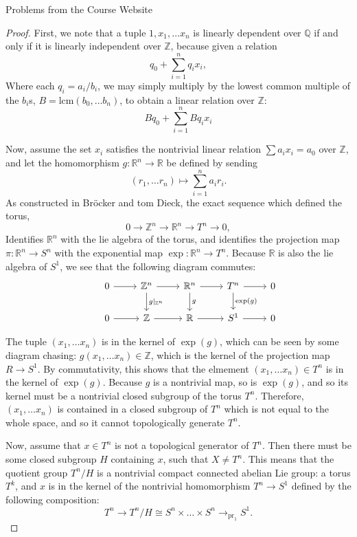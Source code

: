 \documentclass[12pt]{article}
\newcommand{\Q}{\mathbb{Q}}
\newcommand{\Z}{\mathbb{Z}}
\newcommand{\R}{\mathbb{R}}
\theoremstyle{definition}
\newenvironment{problem}[2][Problem]{\begin{trivlist}
\item[\hskip \labelsep {\bfseries #1}\hskip \labelsep {\bfseries #2.}]}{\end{trivlist}}
\begin{document}
\begin{section}{Problems from the Course Website}
\begin{problem}{4}
		\begin{proof}
			First, we note that a tuple $1, x_1, \dots x_n$ is linearly dependent over $\Q$ if and only if it is linearly independent over $\Z$, because given a relation
			\[q_0 + \sum_{i=1}^n q_i x_i,\]
			Where each $q_i = a_i / b_i$, we may simply multiply by the lowest common multiple of the $b_i$s, $B = \text{lcm}(b_0, \dots b_n)$,  to obtain a linear relation over $\Z$:
			\[Bq_0 + \sum_{i=1}^n Bq_ix_i\]
			\par Now, assume the set $x_i$ satisfies the nontrivial linear relation $\sum a_i x_i = a_0$ over $\Z$, and let the homomorphism $g: \R^n \to \R$ be defined by sending
			\[(r_1, \dots r_n) \mapsto \sum_{i=1}^n a_i r_i.\]
			As constructed in Br\"ocker and tom Dieck, the exact sequence which defined the torus,
			\[0 \to \Z^n \to \R^n \to T^n \to 0,\]
			Identifies $\R^n$ with the lie algebra of the torus, and identifies the projection map $\pi: \R^n \to S^n$ with the exponential map $\exp: \R^n \to T^n$. Because $\R$ is also the lie algebra of $S^1$, we see that the following diagram commutes:
			\[\begin{tikzcd}
					&0 \arrow[r, ""] & \Z^n \arrow[r ] \arrow[d,"g \lvert_{\Z^n}"]& \R^n \arrow[r] \arrow[d, "g"] & T^n \arrow[d, "\exp(g)"]\arrow[r] & 0\\
					&0 \arrow[r]& \Z \arrow[r]& \R \arrow[r]& S^1\arrow[r] & 0
			\end{tikzcd}\]
				\par The tuple $(x_1, \dots x_n)$ is in the kernel of $\exp(g)$, which can be seen by some diagram chasing: $g(x_1, \dots x_n) \in \Z$, which is the kernel of the projection map $R \to S^1$. By commutativity, this shows that the elmement $(x_1, \dots x_n) \in T^n$ is in the kernel of $\exp(g)$. Because $g$ is a nontrivial map, so is $\exp(g)$, and so its kernel must be a nontrivial closed subgroup of the torus $T^n$. Therefore, $(x_1, \dots x_n)$ is contained in a closed subgroup of $T^n$ which is not equal to the whole space, and so it cannot topologically generate $T^n$.
				\par Now, assume that $x \in T^n$ is not a topological generator of $T^n$. Then there must be some closed subgroup $H$ containing $x$, such that $X \neq T^n$. This means that the quotient group $T^n/H$ is a nontrivial compact connected abelian Lie group: a torus $T^k$, and $x$ is in the kernel of the nontrivial homomorphism $T^n \to S^1$ defined by the following composition:
				\[T^n \to T^n/H \cong S^n \times \dots \times S^n \rightarrow_{\text{pr}_1} S^1.\]

\end{proof}
\end{problem}
\end{section}
\end{document}
